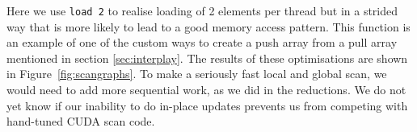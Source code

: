 Here we use {\tt load 2} to realise loading of 2 elements per thread 
but in a strided way that is more likely to lead to a good memory access 
pattern. This function is an example of one of the custom ways to create a 
push array from a pull array mentioned in section \ref{sec:interplay}.
The results of these optimisations are shown in Figure~\ref{fig:scangraphs}.
To make a seriously fast local and global scan, we would need to add
more sequential work, as we did in the reductions. We do not yet know
if our inability to do in-place updates prevents us from competing with
hand-tuned CUDA scan code. 



